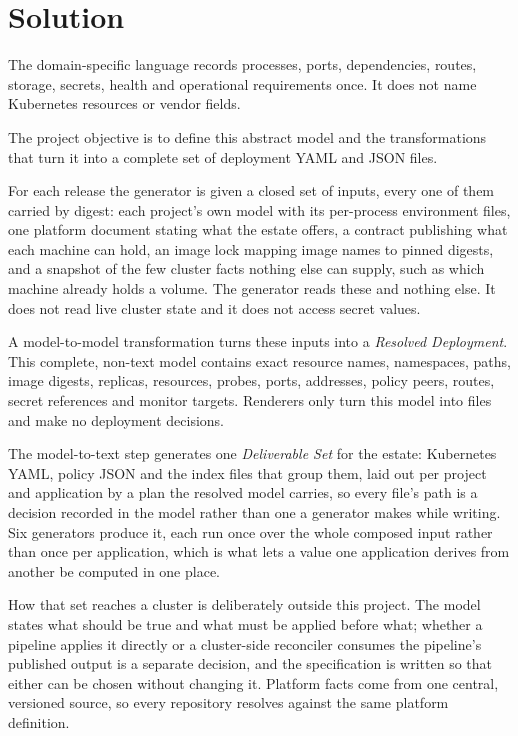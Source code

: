 \section{Solution}
\label{sec:solution}

The domain-specific language records processes, ports, dependencies, routes,
storage, secrets, health and operational requirements once. It does not name
Kubernetes resources or vendor fields.

The project objective is to define this abstract model and the transformations
that turn it into a complete set of deployment YAML and JSON files.

For each release the generator is given a closed set of inputs, every one of
them carried by digest: each project's own model with its per-process
environment files, one platform document stating what the estate offers, a
contract publishing what each machine can hold, an image lock mapping image
names to pinned digests, and a snapshot of the few cluster facts nothing else
can supply, such as which machine already holds a volume. The generator reads
these and nothing else. It does not read live cluster state and it does not
access secret values.

A model-to-model transformation turns these inputs into a \emph{Resolved
Deployment}. This complete, non-text model contains exact resource names,
namespaces, paths, image digests, replicas, resources, probes, ports, addresses,
policy peers, routes, secret references and monitor targets. Renderers only
turn this model into files and make no deployment decisions.

The model-to-text step generates one \emph{Deliverable Set} for the estate:
Kubernetes YAML, policy JSON and the index files that group them, laid out per
project and application by a plan the resolved model carries, so every file's
path is a decision recorded in the model rather than one a generator makes
while writing. Six generators produce it, each run once over the whole
composed input rather than once per application, which is what lets a value
one application derives from another be computed in one place.

How that set reaches a cluster is deliberately outside this project. The model
states what should be true and what must be applied before what; whether a
pipeline applies it directly or a cluster-side reconciler consumes the
pipeline's published output is a separate decision, and the specification is
written so that either can be chosen without changing it. Platform facts come
from one central, versioned source, so every repository resolves against the
same platform definition.
